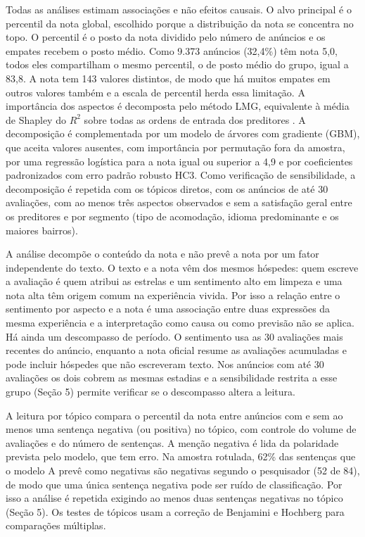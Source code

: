 Todas as análises estimam associações e não efeitos causais. O alvo principal é o percentil da nota global, escolhido porque a distribuição da nota se concentra no topo. O percentil é o posto da nota dividido pelo número de anúncios e os empates recebem o posto médio. Como 9.373 anúncios (32,4\%) têm nota 5,0, todos eles compartilham o mesmo percentil, o de posto médio do grupo, igual a 83,8. A nota tem 143 valores distintos, de modo que há muitos empates em outros valores também e a escala de percentil herda essa limitação. A importância dos aspectos é decomposta pelo método LMG, equivalente à média de Shapley do $R^2$ sobre todas as ordens de entrada dos preditores \citep{lindeman1980,gromping2006}. A decomposição é complementada por um modelo de árvores com gradiente (GBM), que aceita valores ausentes, com importância por permutação fora da amostra, por uma regressão logística para a nota igual ou superior a 4,9 e por coeficientes padronizados com erro padrão robusto HC3. Como verificação de sensibilidade, a decomposição é repetida com os tópicos diretos, com os anúncios de até 30 avaliações, com ao menos três aspectos observados e sem a satisfação geral entre os preditores e por segmento (tipo de acomodação, idioma predominante e os maiores bairros).

A análise decompõe o conteúdo da nota e não prevê a nota por um fator independente do texto. O texto e a nota vêm dos mesmos hóspedes: quem escreve a avaliação é quem atribui as estrelas e um sentimento alto em limpeza e uma nota alta têm origem comum na experiência vivida. Por isso a relação entre o sentimento por aspecto e a nota é uma associação entre duas expressões da mesma experiência e a interpretação como causa ou como previsão não se aplica. Há ainda um descompasso de período. O sentimento usa as 30 avaliações mais recentes do anúncio, enquanto a nota oficial resume as avaliações acumuladas e pode incluir hóspedes que não escreveram texto. Nos anúncios com até 30 avaliações os dois cobrem as mesmas estadias e a sensibilidade restrita a esse grupo (Seção 5) permite verificar se o descompasso altera a leitura.

A leitura por tópico compara o percentil da nota entre anúncios com e sem ao menos uma sentença negativa (ou positiva) no tópico, com controle do volume de avaliações e do número de sentenças. A menção negativa é lida da polaridade prevista pelo modelo, que tem erro. Na amostra rotulada, 62\% das sentenças que o modelo A prevê como negativas são negativas segundo o pesquisador (52 de 84), de modo que uma única sentença negativa pode ser ruído de classificação. Por isso a análise é repetida exigindo ao menos duas sentenças negativas no tópico (Seção 5). Os testes de tópicos usam a correção de Benjamini e Hochberg \citep{benjamini1995} para comparações múltiplas.

